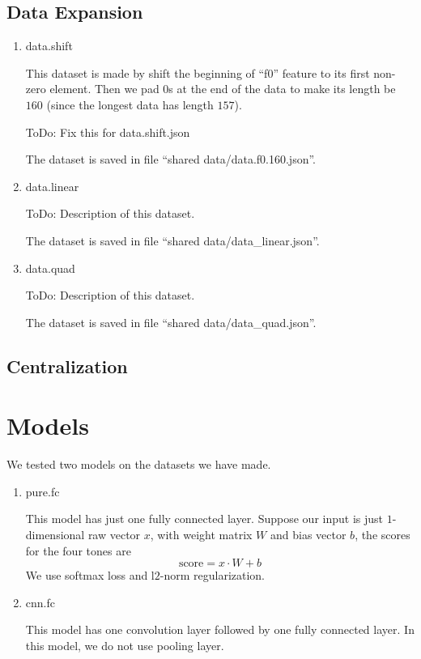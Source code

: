 \documentclass[a4paper]{article}
\begin{document}
\subsection{Data Expansion}
\begin{enumerate}
\item data.shift

	This dataset is made by shift the beginning of ``f0'' feature to its first non-zero element. Then we pad $0$s at the end of the data to make its length be $160$ (since the longest data has length $157$).

	ToDo: Fix this for data.shift.json

	The dataset is saved in file ``shared data/data.f0.160.json''.
\item data.linear

	ToDo: Description of this dataset.

	The dataset is saved in file ``shared data/data\_linear.json''.

\item data.quad
	
	ToDo: Description of this dataset.

	The dataset is saved in file ``shared data/data\_quad.json''.

\end{enumerate}

\subsection{Centralization}

\section{Models}

We tested two models on the datasets we have made.
\begin{enumerate}
\item pure.fc

	This model has just one fully connected layer. Suppose our input is just $1$-dimensional raw vector $x$, with weight matrix $W$ and bias vector $b$, the scores for the four tones are
	\[
		\text{score} = x \cdot W + b
	\]
	We use softmax loss and l$2$-norm regularization.

\item cnn.fc

	This model has one convolution layer followed by one fully connected layer. In this model, we do not use pooling layer.

\end{enumerate}
\end{document}
